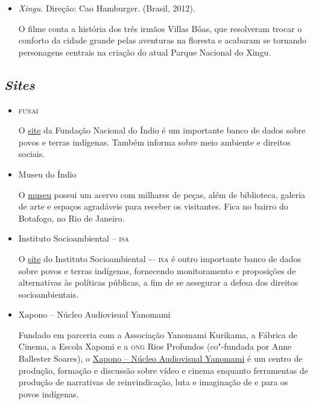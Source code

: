 \documentclass[12pt]{extarticle}
\begin{document}
\begin{itemize}
O filme conta a história do povo Paiter Suruí, da terra indígena Sete de 
Setembro, em Rondônia. O protagonista, Perpera, tinha 20 anos quando seu povo 
teve o primeiro contato com não"-indígenas, em 1969. Com o contato, veio também um pastor 
evangélico que condenava o xamanismo, e Perpera, que era o xamã de
seu povo, se vê obrigado a abandonar sua ancestralidade.

\item \textit{Xingu}. Direção: Cao Hamburger. (Brasil, 2012).

O filme conta a história dos três irmãos Villas Bôas, que resolveram
trocar o conforto da cidade grande pelas aventuras na floresta e
acabaram se tornando personagens centrais na criação do atual Parque
Nacional do Xingu.
\end{itemize}

\subsection{\emph{Sites}}

\begin{itemize}
\item \textsc{funai}

O \href{http://www.gov.br/funai}{site} da Fundação Nacional do Índio é um importante banco de dados
sobre povos e terras indígenas. Também informa sobre meio ambiente e
direitos sociais.

\item Museu do Índio

O \href{http://www.museudoindio.gov.br/}{museu} possui um acervo com milhares de peças, além de biblioteca,
galeria de arte e espaços agradáveis para receber os visitantes. Fica no
bairro do Botafogo, no Rio de Janeiro.

\item Instituto Socioambiental -- \textsc{isa}

O \href{https://www.socioambiental.org/pt-br}{site} do Instituto Socioambiental -– \textsc{isa} é outro importante banco de dados 
sobre povos e terras indígenas, fornecendo monitoramento e proposições de 
alternativas às políticas públicas, a fim de se assegurar a defesa dos direitos
socioambientais. 

\item Xapono -- Núcleo Audiovisual Yanomami

Fundado em parceria com a Associação Yanomami Kurikama, a Fábrica de 
Cinema, a Escola Xapomi e a \textsc{ong} Rios Profundos (co"-fundada por Anne 
Ballester Soares), o \href{https://vimeo.com/xapono?fbclid=IwAR2dao6qx16C1AwtQMf4HGTWCCsQ7ItIUtpq1R8ZiNB4EACiVNuJ-mp_gu8}{Xapono -- Núcleo Audiovisual Yanomami} é um centro 
de produção, formação e discussão sobre vídeo e cinema enquanto 
ferramentas de produção de narrativas de reinvindicação, luta e 
imaginação de e para os povos indígenas.
\end{itemize}
\end{document}

